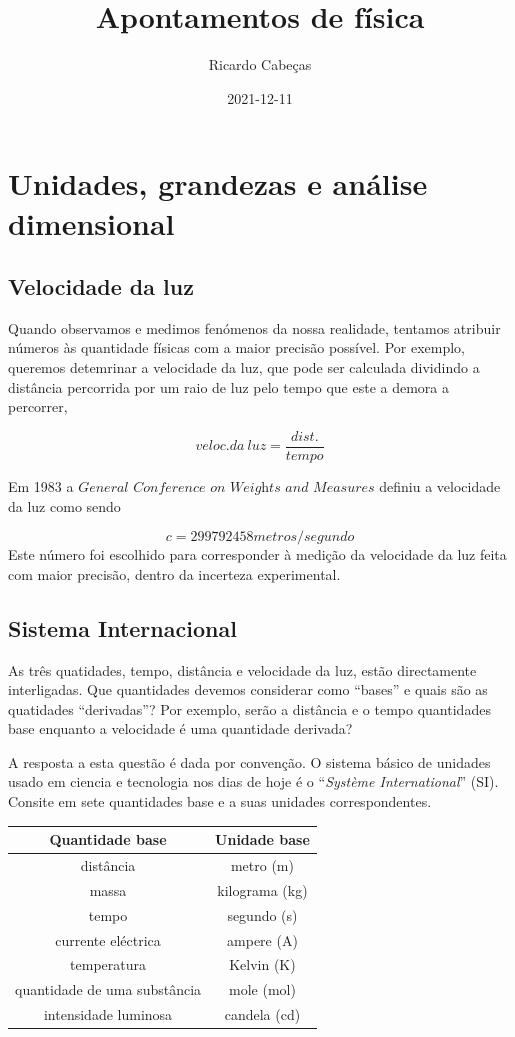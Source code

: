 \documentclass[
  portuguese,
  ]{book}
\title{Apontamentos de física}
\author{Ricardo Cabeças}
\date{2021-12-11}
\begin{document}
\maketitle

{
\setcounter{tocdepth}{1}
\tableofcontents
}
\hypertarget{unidades-grandezas-e-anuxe1lise-dimensional}{%
\chapter{Unidades, grandezas e análise dimensional}\label{unidades-grandezas-e-anuxe1lise-dimensional}}

\hypertarget{velocidade-da-luz}{%
\section{Velocidade da luz}\label{velocidade-da-luz}}

Quando observamos e medimos fenómenos da nossa realidade, tentamos atribuir números às quantidade físicas com a maior precisão possível. Por exemplo, queremos detemrinar a velocidade da luz, que pode ser calculada dividindo a distância percorrida por um raio de luz pelo tempo que este a demora a percorrer,

\[veloc.da\ luz=\frac{dist.}{tempo}\]

Em 1983 a \(\textit{General Conference on Weights and Measures}\) definiu a velocidade da luz como sendo

\[c=299792458metros/segundo\]
Este número foi escolhido para corresponder à medição da velocidade da luz feita com maior precisão, dentro da incerteza experimental.

\hypertarget{sistema-internacional}{%
\section{Sistema Internacional}\label{sistema-internacional}}

As três quatidades, tempo, distância e velocidade da luz, estão directamente interligadas. Que quantidades devemos considerar como ``bases'' e quais são as quatidades ``derivadas''? Por exemplo, serão a distância e o tempo quantidades base enquanto a velocidade é uma quantidade derivada?

A resposta a esta questão é dada por convenção. O sistema básico de unidades usado em ciencia e tecnologia nos dias de hoje é o ``\emph{Système International}'' (SI). Consite em sete quantidades base e a suas unidades correspondentes.

\begin{longtable}[]{@{}cc@{}}
\toprule
Quantidade base & Unidade base\tabularnewline
\midrule
\endhead
distância & metro (m)\tabularnewline
massa & kilograma (kg)\tabularnewline
tempo & segundo (s)\tabularnewline
currente eléctrica & ampere (A)\tabularnewline
temperatura & Kelvin (K)\tabularnewline
quantidade de uma substância & mole (mol)\tabularnewline
intensidade luminosa & candela (cd)\tabularnewline
\bottomrule
\end{longtable}
\end{document}
